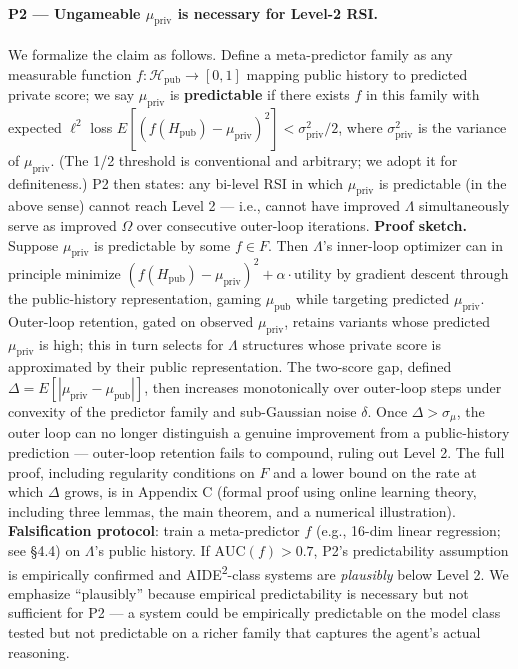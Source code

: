 \paragraph{P2 --- Ungameable $\mu_{\text{priv}}$ is necessary for Level-2 RSI.}
We formalize the claim as follows. Define a meta-predictor family as any measurable function $f : \mathcal{H}_{\text{pub}} \to [0,1]$ mapping public history to predicted private score; we say $\mu_{\text{priv}}$ is \textbf{predictable} if there exists $f$ in this family with expected $\ell^2$ loss $E[(f(H_{\text{pub}}) - \mu_{\text{priv}})^2] < \sigma^2_{\text{priv}} / 2$, where $\sigma^2_{\text{priv}}$ is the variance of $\mu_{\text{priv}}$. (The 1/2 threshold is conventional and arbitrary; we adopt it for definiteness.) P2 then states: any bi-level RSI in which $\mu_{\text{priv}}$ is predictable (in the above sense) cannot reach Level 2 --- i.e., cannot have improved $\Lambda$ simultaneously serve as improved $\Omega$ over consecutive outer-loop iterations. \textbf{Proof sketch.} Suppose $\mu_{\text{priv}}$ is predictable by some $f \in F$. Then $\Lambda$'s inner-loop optimizer can in principle minimize $(f(H_{\text{pub}}) - \mu_{\text{priv}})^2 + \alpha \cdot \text{utility}$ by gradient descent through the public-history representation, gaming $\mu_{\text{pub}}$ while targeting predicted $\mu_{\text{priv}}$. Outer-loop retention, gated on observed $\mu_{\text{priv}}$, retains variants whose predicted $\mu_{\text{priv}}$ is high; this in turn selects for $\Lambda$ structures whose private score is approximated by their public representation. The two-score gap, defined $\Delta = E[|\mu_{\text{priv}} - \mu_{\text{pub}}|]$, then increases monotonically over outer-loop steps under convexity of the predictor family and sub-Gaussian noise $\delta$. Once $\Delta > \sigma_\mu$, the outer loop can no longer distinguish a genuine improvement from a public-history prediction --- outer-loop retention fails to compound, ruling out Level 2. The full proof, including regularity conditions on $F$ and a lower bound on the rate at which $\Delta$ grows, is in Appendix C (formal proof using online learning theory, including three lemmas, the main theorem, and a numerical illustration). \textbf{Falsification protocol}: train a meta-predictor $f$ (e.g., 16-dim linear regression; see \S4.4) on $\Lambda$'s public history. If $\text{AUC}(f) > 0.7$, P2's predictability assumption is empirically confirmed and AIDE\textsuperscript{2}-class systems are \textit{plausibly} below Level 2. We emphasize ``plausibly'' because empirical predictability is necessary but not sufficient for P2 --- a system could be empirically predictable on the model class tested but not predictable on a richer family that captures the agent's actual reasoning.

